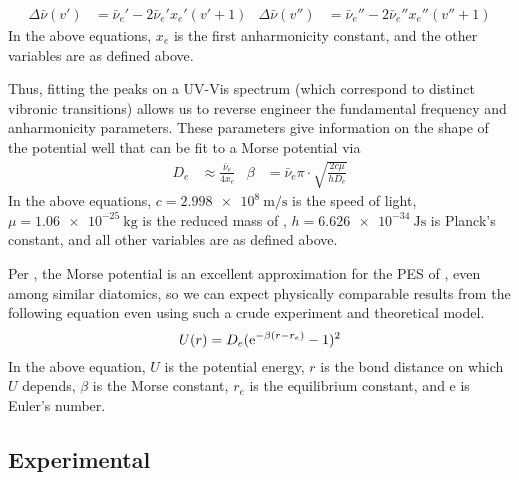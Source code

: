 \documentclass[../labs.tex]{subfiles}
\begin{document}
\begin{align*}
    \Delta\bar{\nu}(v') &= \bar{\nu}_e'-2\bar{\nu}_e'x_e'(v'+1)&
    \Delta\bar{\nu}(v'') &= \bar{\nu}_e''-2\bar{\nu}_e''x_e''(v''+1)
\end{align*}
In the above equations, $x_e$ is the first anharmonicity constant, and the other variables are as defined above.\par
Thus, fitting the peaks on a UV-Vis spectrum (which correspond to distinct vibronic transitions) allows us to reverse engineer the fundamental frequency and anharmonicity parameters. These parameters give information on the shape of the potential well that can be fit to a Morse potential via\supercite{bib:LabManual}
\begin{align*}
    D_e &\approx \frac{\bar{\nu}_e}{4x_e}&
    \beta &= \bar{\nu}_e\pi\cdot\sqrt{\frac{2c\mu}{hD_e}}
\end{align*}
In the above equations, $c=\SI{2.998e8}{\meter\per\second}$ is the speed of light, $\mu=\SI{1.06e-25}{\kilo\gram}$ is the reduced mass of , $h=\SI{6.626e-34}{\joule\second}$ is Planck's constant, and all other variables are as defined above.\par
Per \textcite{bib:MorseAccuracy}, the Morse potential is an excellent approximation for the PES of , even among similar diatomics, so we can expect physically comparable results from the following equation even using such a crude experiment and theoretical model.
\begin{equation*}
    U(r) = D_e(\e[-\beta(r-r_e)]-1)^2
\end{equation*}
In the above equation, $U$ is the potential energy, $r$ is the bond distance on which $U$ depends, $\beta$ is the Morse constant, $r_e$ is the equilibrium constant, and e is Euler's number.


\subsection*{Experimental}
\end{document}
